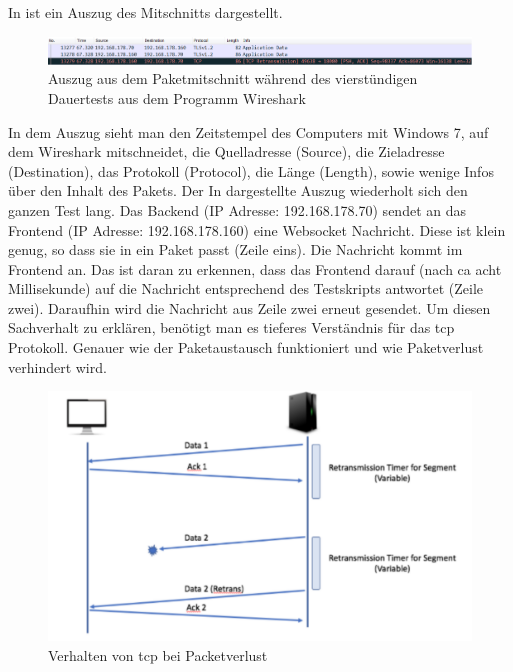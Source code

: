 In  ist ein Auszug des Mitschnitts dargestellt.
\begin{figure}[ht]
  \centering
  \includegraphics[width=\textwidth]{content/hauptteil/umsetzungPoC/pocTest/res/LatenzNormal4hWireshark.pdf}
  \caption{Auszug aus dem Paketmitschnitt während des vierstündigen Dauertests aus dem Programm \mbox{Wireshark} \citep{wireshark:program}}
  \label{fig:testing:latency4hNorm:wireshark}
\end{figure}
In dem Auszug sieht man den Zeitstempel des Computers mit Windows 7, auf dem Wireshark mitschneidet, die Quelladresse (Source), die Zieladresse (Destination), das Protokoll (Protocol), die Länge (Length), sowie wenige Infos über den Inhalt des Pakets.
Der In  dargestellte Auszug wiederholt sich den ganzen Test lang.
Das Backend (IP Adresse: 192.168.178.70) sendet an das Frontend (IP Adresse: 192.168.178.160) eine Websocket Nachricht. Diese ist klein genug, so dass sie in ein Paket passt (Zeile eins).
Die Nachricht kommt im Frontend an. Das ist daran zu erkennen, dass das Frontend darauf (nach ca acht Millisekunde) auf die Nachricht entsprechend des Testskripts antwortet (Zeile zwei).
Daraufhin wird die Nachricht aus Zeile zwei erneut gesendet.
Um diesen Sachverhalt zu erklären, benötigt man es tieferes Verständnis für das \ac{tcp} Protokoll. Genauer wie der Paketaustausch funktioniert und wie Paketverlust verhindert wird.
\begin{figure}[ht]
  \centering
  \includegraphics[width=\textwidth]{content/hauptteil/umsetzungPoC/pocTest/res/tcpPackageLostGraph.pdf}
  \caption{Verhalten von \ac{tcp} bei Packetverlust \citep{tcp:articel}}
  \label{fig:testing:tcp:retrans}
\end{figure}
